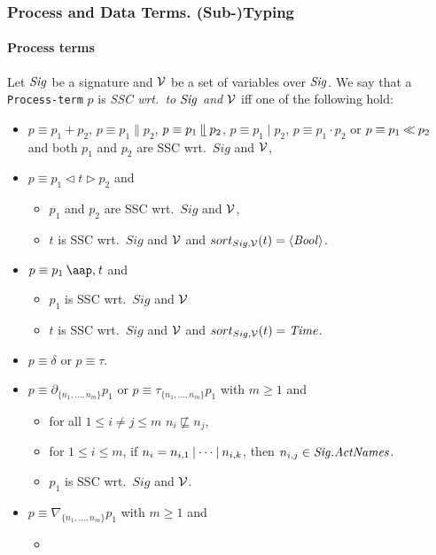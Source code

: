 \documentclass[fleqn,a4paper,dvips]{article}
\newcommand{\Sig}{\nm{Sig}}
\newcommand{\NV}{{\cal V}}
\begin{document}
\subsubsection{Process and Data Terms. (Sub-)Typing}

\paragraph{Process terms}
Let $\Sig$ be a signature and $\NV$ be a set of variables over $\Sig$.
We say that a {\tt Process-term} $p$ is {\it SSC wrt.\ to $\Sig$ and
$\NV$} iff one of the following hold:
\begin{itemize}
\item
  $p\equiv p_1+p_2$,
  $p\equiv p_1\parallel p_2$, $p\equiv p_1\mathbin{\mathrel{\llfloor}} p_2$, $p\equiv p_1\mid
  p_2$,
  $p\equiv p_1 {\cdot} p_2$ or $p\equiv p_1\mathbin{\ll} p_2$ and both $p_1$ and $p_2$ are SSC wrt.\ $Sig$ and $\NV$,
\item
  $p\equiv p_1\triangleleft t \triangleright p_2$ and
  \begin{itemize}
  \item
    $p_1$ and $p_2$ are SSC wrt.\ $Sig$ and $\NV$,
  \item
    $t$ is SSC wrt.\ $Sig$ and $\NV$ and $sort_{Sig,\NV}(t)=\seq{\Bool}$.
  \end{itemize}
\item
  $p\equiv p_1\at{t}$ and
  \begin{itemize}
\item
  $p_1$ is SSC wrt.\ $Sig$ and $\NV$
\item
  $t$ is SSC wrt.\ $Sig$ and $\NV$ and $sort_{Sig,\NV}(t)=\Time$.
\end{itemize}
\item
  $p\equiv \delta$ or $p\equiv\tau$.
\item
  $p\equiv\partial_{\{n_1,\ldots,n_m\}}p_1$ or
  $p\equiv \tau_{\{n_1,\ldots,n_m\}}p_1$ with $m\geq 1$ and
  \begin{itemize}
\item
  for all $1\leq i\neq j \leq m$ $n_i\not\sqsubseteq n_j$,
\item
  for $1\leq i\leq m$, if $n_i=n_{i,1}\comm\dots\comm n_{i,k}$, then $n_{i,j}\in \Sig.\nm{ActNames}$.
\item
  $p_1$ is SSC wrt.\ $Sig$ and $\NV$.
\end{itemize}
\item
  $p\equiv\nabla_{\{n_1,\ldots,n_m\}}p_1$ with $m\geq 1$ and
  \begin{itemize}
  \item

\end{itemize}
\end{itemize}
\end{document}
